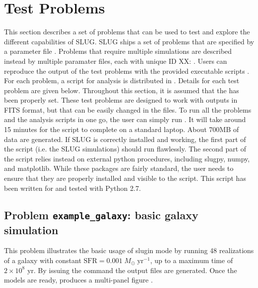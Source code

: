 \documentclass[letterpaper,10pt,english]{sphinxmanual}
\begin{document}
\chapter{Test Problems}
\label{tests:test-problems}\label{tests::doc}\label{tests:sec-tests}
This section describes a set of problems that can be used to test and explore the different capabilities of SLUG. SLUG ships a
set of problems  that are specified by a parameter file . Problems that require
multiple simulations are described instead by multiple paramater files, each with unique ID XX:  .
Users can reproduce the output of the test problems with the provided executable scripts  .
For each problem, a script for analysis is distributed  in . Details for each test problem are given below. Throughout this section, it is assumed that the  has been properly set.
These test problems are designed to work with outputs in FITS format, but that can be easily changed in the
 files. To run all the problems and the analysis scripts in one go, the user can simply
run . It will take around 15 minutes
for the script to complete on a standard laptop. About 700MB of data are generated.
If SLUG is correctly installed and working, the first part of the script (i.e. the SLUG
simulations) should run flawlessly. The second part of the script relies instead on external python procedures,
including slugpy, numpy, and matplotlib. While these packages are fairly standard, the user needs to ensure that
they are properly installed and visible to the script. This script has been written for and tested with Python 2.7.


\section{Problem \texttt{example\_galaxy}: basic galaxy simulation}
\label{tests:problem-example-galaxy-basic-galaxy-simulation}
This problem illustrates the basic usage of slugin  mode by running 48 realizations of a galaxy with constant
\(\mathrm{SFR}=0.001\; M_\odot\;\mathrm{yr}^{-1}\), up to a maximum time of \(2\times 10^8\) yr. By issuing the
command  the output files  are generated. Once the models are ready,
 produces a multi-panel figure .
\end{document}
